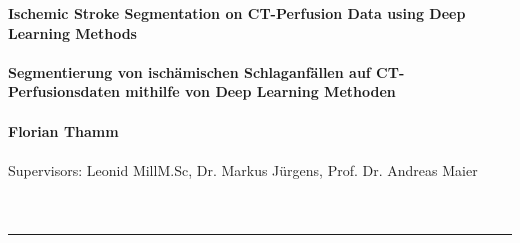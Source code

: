 \documentclass{article}%
\begin{document}
\begin{center}
\textbf{\huge{Ischemic Stroke Segmentation  on CT-Perfusion Data using Deep Learning Methods} \\~\\ {\large Segmentierung von isch\"amischen Schlaganf\"allen auf CT-Perfusionsdaten mithilfe von Deep Learning Methoden \\~\\ Florian Thamm\footnotemark[1]\footnotemark[2]}} \\~\\
Supervisors: Leonid Mill\footnotemark[1] M.Sc, Dr. Markus J\"urgens\footnotemark[2], Prof. Dr. Andreas Maier\footnotemark[1]\\~\\
\\
\end{center}
\noindent\rule{\textwidth}{1pt}
\end{document}

